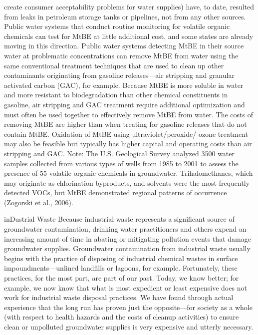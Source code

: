 \documentclass{article}
\begin{document}
create consumer acceptability problems for water supplies) have, to
date, resulted from leaks in petroleum storage tanks or pipelines, not
from any other sources. Public water systems that conduct routine
monitoring for volatile organic chemicals can test for MtBE at little
additional cost, and some states are already moving in this direction.
Public water systems detecting MtBE in their source water at problematic
concentrations can remove MtBE from water using the same conventional
treatment techniques that are used to clean up other contaminants
originating from gasoline releases---air stripping and granular
activated carbon (GAC), for example. Because MtBE is more soluble in
water and more resistant to biodegradation than other chemical
constituents in gasoline, air stripping and GAC treatment require
additional optimization and must often be used together to effectively
remove MtBE from water. The costs of removing MtBE are higher than when
treating for gasoline releases that do not contain MtBE. Oxidation of
MtBE using ultraviolet/peroxide/ ozone treatment may also be feasible
but typically has higher capital and operating costs than air stripping
and GAC. Note: The U.S. Geological Survey analyzed 3500 water samples
collected from various types of wells from 1985 to 2001 to assess the
presence of 55 volatile organic chemicals in groundwater.
Trihalomethanes, which may originate as chlorination byproducts, and
solvents were the most frequently detected VOCs, but MtBE demonstrated
regional patterns of occurrence (Zogorski et al., 2006).

inDustrial Waste Because industrial waste represents a significant
source of groundwater contamination, drinking water practitioners and
others expend an increasing amount of time in abating or mitigating
pollution events that damage groundwater supplies. Groundwater
contamination from industrial waste usually begins with the practice of
disposing of industrial chemical wastes in surface
impoundments---unlined landfills or lagoons, for example. Fortunately,
these practices, for the most part, are part of our past. Today, we know
better; for example, we now know that what is most expedient or least
expensive does not work for industrial waste disposal practices. We have
found through actual experience that the long run has proven just the
opposite---for society as a whole (with respect to health hazards and
the costs of cleanup activities) to ensure clean or unpolluted
groundwater supplies is very expensive and utterly necessary.
\end{document}
